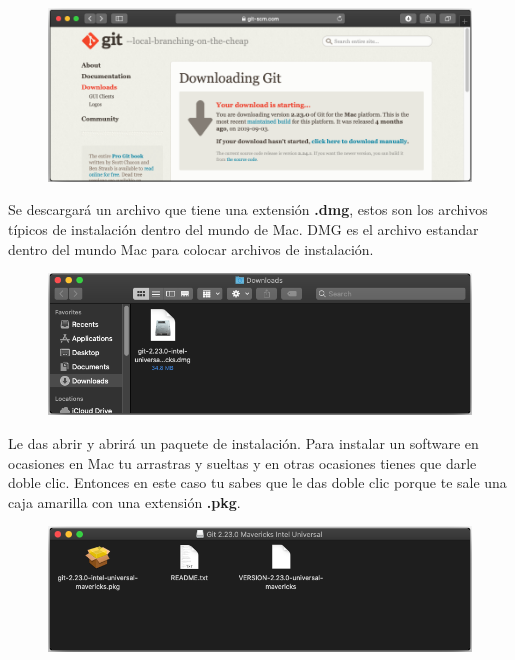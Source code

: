 \documentclass{article}
\begin{document}
\begin{figure}[h!]
  \centering
  \includegraphics[scale=0.5]{./Pictures/023_mac_git.png}
\end{figure}

Se descargará un archivo que tiene una extensión \textbf{.dmg}, estos son los
archivos típicos de instalación dentro del mundo de Mac. DMG es el archivo
estandar dentro del mundo Mac para colocar archivos de instalación.

\begin{figure}[h!]
  \centering
  \includegraphics[scale=0.5]{./Pictures/024_mac_git.png}
\end{figure}

Le das abrir y abrirá un paquete de instalación. Para instalar un software en
ocasiones en Mac tu arrastras y sueltas y en otras ocasiones tienes que darle
doble clic. Entonces en este caso tu sabes que le das doble clic porque te sale
una caja amarilla con una extensión \textbf{.pkg}.

\newpage

\begin{figure}[h!]
  \centering
  \includegraphics[scale=0.5]{./Pictures/025_mac_git.png}
\end{figure}
\end{document}
